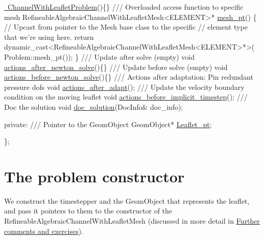 \begin{DoxyCodeInclude}
\textcolor{comment}{} \hyperlink{classChannelWithLeafletProblem_a5dec8333d345e4bcaac7fcd5b463eafc}{~ChannelWithLeafletProblem}()\{\}
\textcolor{comment}{}
\textcolor{comment}{ /// Overloaded access function to specific mesh}
\textcolor{comment}{} RefineableAlgebraicChannelWithLeafletMesh<ELEMENT>* \hyperlink{classChannelWithLeafletProblem_a023dc7718a98f820e4bc4541150a0c08}{mesh\_pt}() 
  \{
   \textcolor{comment}{// Upcast from pointer to the Mesh base class to the specific }
   \textcolor{comment}{// element type that we're using here.}
   \textcolor{keywordflow}{return} \textcolor{keyword}{dynamic\_cast<}RefineableAlgebraicChannelWithLeafletMesh<ELEMENT>*\textcolor{keyword}{>}(
    Problem::mesh\_pt());
  \}
 \textcolor{comment}{}
\textcolor{comment}{ /// Update after solve (empty)}
\textcolor{comment}{} \textcolor{keywordtype}{void} \hyperlink{classChannelWithLeafletProblem_a2fcba9dc98f40bbca1919a715fa087d7}{actions\_after\_newton\_solve}()\{\}
\textcolor{comment}{}
\textcolor{comment}{ /// Update before solve (empty)}
\textcolor{comment}{} \textcolor{keywordtype}{void} \hyperlink{classChannelWithLeafletProblem_a5721dfad66d13a1ae60adce7801dcb12}{actions\_before\_newton\_solve}()\{\}
\textcolor{comment}{}
\textcolor{comment}{ /// Actions after adaptation: Pin redundant pressure dofs}
\textcolor{comment}{} \textcolor{keywordtype}{void} \hyperlink{classChannelWithLeafletProblem_a7978755f073d950e5012951ced9e455e}{actions\_after\_adapt}();
\textcolor{comment}{}
\textcolor{comment}{ /// Update the velocity boundary condition on the moving leaflet}
\textcolor{comment}{} \textcolor{keywordtype}{void} \hyperlink{classChannelWithLeafletProblem_acef6ec771775162f77295a8f92d695ac}{actions\_before\_implicit\_timestep}();
\textcolor{comment}{}
\textcolor{comment}{ /// Doc the solution}
\textcolor{comment}{} \textcolor{keywordtype}{void} \hyperlink{classChannelWithLeafletProblem_adb8e1420844f7b40d71beae81111c4d0}{doc\_solution}(DocInfo& doc\_info);

\textcolor{keyword}{private}:
\textcolor{comment}{}
\textcolor{comment}{ /// Pointer to the GeomObject}
\textcolor{comment}{} GeomObject* \hyperlink{classChannelWithLeafletProblem_ac32f0451749ec4e85d39246f5823a5f2}{Leaflet\_pt};
 
\};

\end{DoxyCodeInclude}




 

\hypertarget{index_constructor}{}\section{The problem constructor}\label{index_constructor}
We construct the timestepper and the {\ttfamily Geom\+Object} that represents the leaflet, and pass it pointers to them to the constructor of the {\ttfamily Refineable\+Algebraic\+Channel\+With\+Leaflet\+Mesh} (discussed in more detail in \hyperlink{index_comm_and_ex}{Further comments and exercises}).



